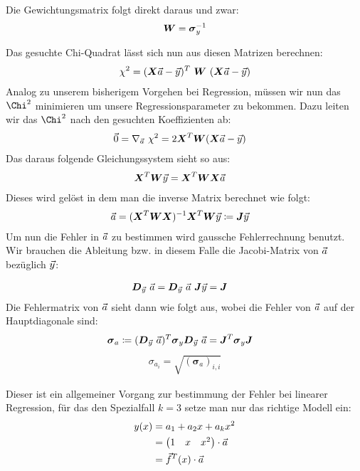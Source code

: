 \documentclass[11pt]{article}
\begin{document}
    Die Gewichtungsmatrix folgt direkt daraus und zwar:
    \begin{align*}
        \boldsymbol{W} = \boldsymbol{\sigma}_{y}^{-1}
    \end{align*}
    
    Das gesuchte Chi-Quadrat lässt sich nun aus diesen Matrizen berechnen:
    \begin{align*}
        \chi^2 = (\boldsymbol{X} \vec{a} - \vec{y})^T \ \boldsymbol{W} \ (\boldsymbol{X} \vec{a} - \vec{y})
    \end{align*}
    Analog zu unserem bisherigem Vorgehen bei Regression, müssen wir nun das $\Chi^2$ minimieren um unsere Regressionsparameter zu bekommen.
    Dazu leiten wir das $\Chi^2$ nach den gesuchten Koeffizienten ab:
    \begin{align*}
        \vec{0} &= \nabla_{\vec{a}} \ \chi^2 = 2 \boldsymbol{X}^T \boldsymbol{W} (\boldsymbol{X} \vec{a} - \vec{y})
    \end{align*}
    Das daraus folgende Gleichungssystem sieht so aus:
    \begin{align*}
        \boldsymbol{X}^T \boldsymbol{W} \vec{y} &= \boldsymbol{X}^T \boldsymbol{W} \boldsymbol{X} \vec{a}
    \end{align*}
    Dieses wird gelöst in dem man die inverse Matrix berechnet wie folgt:
    \newcommand{\mMatrix}{\boldsymbol{J}}
    \begin{align*}
        \aVec &= (\xMatrixT \eMatrixInv \xMatrix)^{-1} \xMatrixT \eMatrixInv \yVec \coloneqq \mMatrix \yVec
    \end{align*}
    Um nun die Fehler in $\vec{a}$ zu bestimmen wird gaussche Fehlerrechnung benutzt. Wir brauchen die Ableitung bzw. in diesem Falle die
    Jacobi-Matrix von $\vec{a}$ bezüglich $\vec{y}$:
    \newcommand{\jacMatrix}{\boldsymbol{D}_{\yVec} \ \aVec}

    \begin{align*}
        \jacMatrix &= \jacMatrix \ \mMatrix \yVec = \mMatrix
    \end{align*}
    Die Fehlermatrix von $\vec{a}$ sieht dann wie folgt aus, wobei die Fehler von $\vec{a}$ auf der Hauptdiagonale sind:
    \newcommand{\eaMatrix}{\boldsymbol{\sigma}_{a}}
    \begin{align*}
        \eaMatrix &\coloneqq (\jacMatrix)^T \eMatrix \jacMatrix = \mMatrix^T \eMatrix \mMatrix
    \end{align*}
    \begin{align*}
        \sigma_{a_i} = \sqrt {(\eaMatrix)_{i,i}}
    \end{align*}
    
    Dieser ist ein allgemeiner Vorgang zur bestimmung der Fehler bei linearer Regression, für das den Spezialfall $k=3$ setze man
    nur das richtige Modell ein:
    \begin{align*}
        y(x) &= a_1 + a_2 x + a_k x^2 \\
        &= \begin{pmatrix}
               1 & x & x^2
        \end{pmatrix} \cdot \vec{a} \\
        &= \vec{f}^{T}(x) \cdot \vec{a}
    \end{align*}
    
\end{document}
